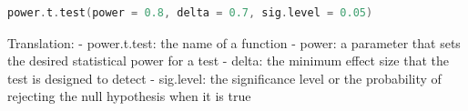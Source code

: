 \begin{lstlisting}[language=c++,label={code:20_16},caption={power.t.test function}]
power.t.test(power = 0.8, delta = 0.7, sig.level = 0.05)
\end{lstlisting}

Translation:
- power.t.test: the name of a function
- power: a parameter that sets the desired statistical power for a test
- delta: the minimum effect size that the test is designed to detect
- sig.level: the significance level or the probability of rejecting the null hypothesis when it is true
